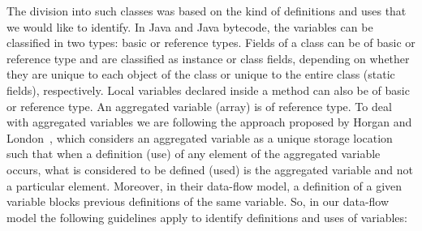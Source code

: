 

The division into such classes was based on the kind of
definitions and uses that we would like to identify. In Java and
Java bytecode, the variables can be classified in two types: basic
or reference types. Fields of a class can be of basic or reference
type and are classified as instance or class fields, depending on
whether they are unique to each object of the class or unique to
the entire class (static fields), respectively. Local variables
declared inside a method can also be of basic or reference type.
An aggregated variable (array) is of reference type. To deal with
aggregated variables we are following the approach proposed by
Horgan and London~\cite{Horgan91DFCC}, which considers an
aggregated variable as a unique storage location such that when a
definition (use) of any element of the aggregated variable occurs,
what is considered to be defined (used) is the aggregated variable
and not a particular element. Moreover, in their data-flow model,
a definition of a given variable blocks previous definitions of
the same variable. So, in our data-flow model the following
guidelines apply to identify definitions and uses of variables:

